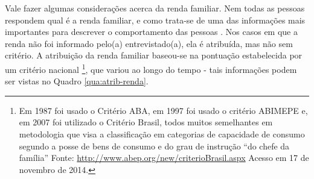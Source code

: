 



Vale fazer algumas considerações acerca da renda familiar. Nem todas as pessoas respondem qual é a renda familiar, e como trata-se de uma das informações mais importantes para descrever o comportamento das pessoas \cite{SHEARMUR2006}.%
Nos casos em que a renda não foi informado pelo(a) entrevistado(a), ela é atribuída, mas não sem critério. A atribuição da renda familiar baseou-se na pontuação estabelecida por um critério nacional%
\footnote{Em 1987 foi usado o Critério ABA, em 1997 foi usado o critério ABIMEPE e, em 2007 foi utilizado o Critério Brasil, todos muitos semelhantes em metodologia que visa a classificação em categorias de capacidade de consumo segundo a posse de bens de consumo e do grau de instrução ``do chefe da família''
Fonte: \url{http://www.abep.org/new/criterioBrasil.aspx} Acesso em 17 de novembro de 2014.},
que variou ao longo do tempo - tais informações podem ser vistas no Quadro \ref{qua:atrib-renda}.

